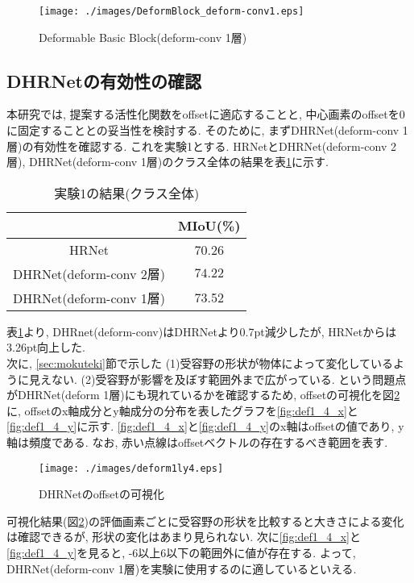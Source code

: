 \begin{figure}[H]
    \centering
    \texttt{[image: ./images/DeformBlock\_deform-conv1.eps]}
    \caption{Deformable Basic Block(deform-conv 1層)}
    \label{fig:defbasicblockv2}
\end{figure}

\subsection{DHRNetの有効性の確認}
本研究では, 提案する活性化関数をoffsetに適応することと, 中心画素のoffsetを0に固定することとの妥当性を検討する. 
そのために, まずDHRNet(deform-conv 1層)の有効性を確認する. これを実験1とする. HRNetとDHRNet(deform-conv 2層), DHRNet(deform-conv 1層)のクラス全体の結果を表\ref{tab:tekiyouiti}に示す.

\begin{table}[H]
    \centering
    \caption{実験1の結果(クラス全体)}
    \begin{tabular}{c|c} \hline \hline
       & MIoU(\%)  \\ \hline
      HRNet & 70.26  \\ \hline
      DHRNet(deform-conv 2層) & $\mathbf{74.22}$  \\ \hline
      DHRNet(deform-conv 1層) & 73.52  \\ \hline \hline 
    \end{tabular}
    \label{tab:tekiyouiti}
\end{table}
表\ref{tab:tekiyouiti}より, DHRnet(deform-conv)はDHRNetより0.7pt減少したが, HRNetからは3.26pt向上した. \\
次に, \ref{sec:mokuteki}節で示した (1)受容野の形状が物体によって変化しているように見えない. (2)受容野が影響を及ぼす範囲外まで広がっている.  という問題点がDHRNet(deform 1層)にも現れているかを確認するため, offsetの可視化を図\ref{fig:def1_4}に, offsetのx軸成分とy軸成分の分布を表したグラフを\ref{fig:def1_4_x}と\ref{fig:def1_4_y}に示す. \ref{fig:def1_4_x}と\ref{fig:def1_4_y}のx軸はoffsetの値であり, y軸は頻度である. なお, 赤い点線はoffsetベクトルの存在するべき範囲を表す.

\begin{figure}[H]
    \begin{center}
    \texttt{[image: ./images/deform1ly4.eps]}
    \end{center}
    \caption{DHRNetのoffsetの可視化}
    \label{fig:def1_4}
\end{figure}

可視化結果(図\ref{fig:def1_4})の評価画素ごとに受容野の形状を比較すると大きさによる変化は確認できるが, 形状の変化はあまり見られない. 次に\ref{fig:def1_4_x}と\ref{fig:def1_4_y}を見ると, -6以上6以下の範囲外に値が存在する. よって, DHRNet(deform-conv 1層)を実験に使用するのに適しているといえる.

